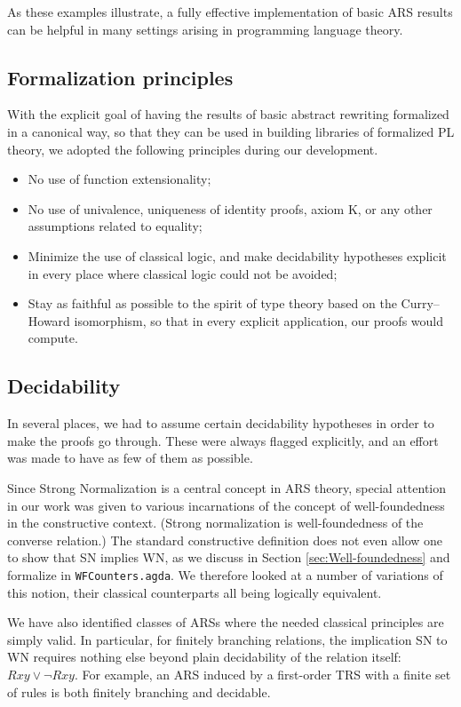 As these examples illustrate, a fully effective implementation of basic ARS results
can be helpful in many settings arising in programming language theory.

\subsection{Formalization principles}
With the explicit goal of having the results of basic abstract rewriting
formalized in a canonical way, so that they can be used in building
libraries of formalized PL theory, we adopted the following
principles during our development.

\begin{itemize}
  \item No use of function extensionality;
  \item No use of univalence, uniqueness of identity proofs, axiom K, or any other
  assumptions related to equality;
  \item Minimize the use of classical logic, and make decidability hypotheses explicit in every place where classical logic could not be avoided;
  \item Stay as faithful as possible to the spirit of type theory based on the Curry--Howard isomorphism, so that in every explicit application, our proofs would compute.
\end{itemize}

\subsection{Decidability}
In several places, we had to assume certain decidability hypotheses in order to make
the proofs go through.  These were always flagged explicitly, and an effort was made to
have as few of them as possible.

Since Strong Normalization is a central concept in ARS theory,
special attention in our work was given to various incarnations of the concept of well-foundedness in the constructive context.
(Strong normalization is well-foundedness of the converse relation.)
The standard constructive definition does not even allow one to show that SN implies WN, as we discuss in Section \ref{sec:Well-foundedness} and formalize in \texttt{WFCounters.agda}.
  We therefore looked at a number of variations of this notion, their classical counterparts all being logically equivalent. %

We have also identified classes of ARSs where the needed classical principles are simply valid.  In particular, for finitely branching relations, the implication SN to WN requires nothing else beyond plain decidability of the relation itself: $Rxy \lor \lnot Rxy$.  For example, an ARS induced by a first-order TRS with a finite set of rules is both finitely branching and decidable.


